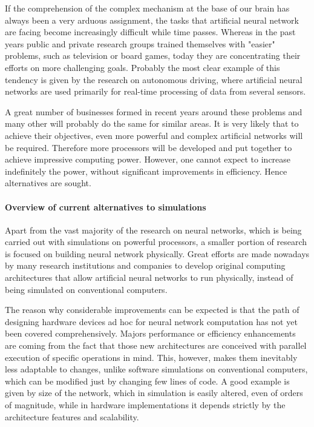 If the comprehension of the complex mechanism at the base of our brain has always been a very arduous assignment, the tasks that artificial neural network are facing become increasingly difficult while time passes.
Whereas in the past years public and private research groups trained themselves with "easier" problems, such as television or board games, today they are concentrating their efforts on more challenging goals.
Probably the most clear example of this tendency is given by the research on autonomous driving, where artificial neural networks are used primarily for real-time processing of data from several sensors.

A great number of businesses formed in recent years around these problems and many other will probably do the same for similar areas.
It is very likely that to achieve their objectives, even more powerful and complex artificial networks will be required.
Therefore more processors will be developed and put together to achieve impressive computing power.
However, one cannot expect to increase indefinitely the power, without significant improvements in efficiency.
Hence alternatives are sought.

\paragraph{Overview of current alternatives to simulations\\}
Apart from the vast majority of the research on neural networks, which is being carried out with simulations on powerful processors, a smaller portion of research is focused on building neural network physically.
Great efforts are made nowadays by many research institutions and companies to develop original computing architectures that allow artificial neural networks to run physically, instead of being simulated on conventional computers.

The reason why considerable improvements can be expected is that the path of designing hardware devices ad hoc for neural network computation has not yet been covered comprehensively.
Majors performance or efficiency enhancements are coming from the fact that those new architectures are conceived with parallel execution of specific operations in mind.
This, however, makes them inevitably less adaptable to changes, unlike software simulations on conventional computers, which can be modified just by changing few lines of code.
A good example is given by size of the network, which in simulation is easily altered, even of orders of magnitude, while in hardware implementations it depends strictly by the architecture features and scalability.
%

